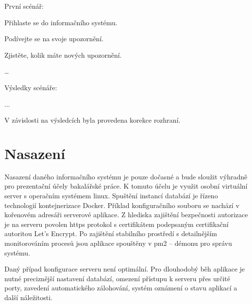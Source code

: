 První scénář:
\begin{olnar}
   \item Přihlaste se do informačního systému.
   \item Podívejte se na svoje upozornění.
   \item Zjistěte, kolik máte nových upozornění.
   \item \dots
\end{olnar}

Výsledky scénáře:

... 

V závislosti na výsledcích byla provedena korekce rozhraní.




\section{Nasazení}

Nasazení daného informačního systému je pouze dočasné a bude sloužit výhradně pro prezentační účely bakalářské práce. K tomuto účelu je využit osobní virtuální server s operačním systémem linux. Spuštění instancí databází je řízeno technologií kontejnerizace Docker. Příklad konfiguračního souboru se nachází v kořenovém adresáři serverové aplikace. Z hlediska zajištění bezpečnosti autorizace je na serveru povolen \gls{https} protokol s certifikátem podepsaným certifikační autoritou Let’s Encrypt. Po zajištění stabilního prostředí s detailnějším monitorováním procesů jsou aplikace spouštěny v pm2 -- démonu pro správu systému.

Daný případ konfigurace serveru není optimální. Pro dlouhodobý běh aplikace je nutné preciznější nastavení databází, omezení přístupu k serveru přes určité porty, zavedení automatického zálohování, systém oznámení o stavu aplikací a další náležitosti.


